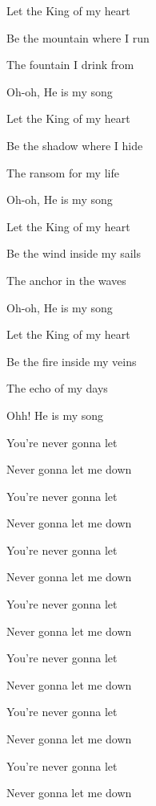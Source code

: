 \documentclass[9pt]{extarticle}
\begin{document}
\bsong

\bi

\ei

\bv
Let the King of my heart

Be the mountain where I run

The fountain I drink from

Oh-oh, He is my song

Let the King of my heart

Be the shadow where I hide

The ransom for my life

Oh-oh, He is my song
\ev

\bc

\ec

\bv
Let the King of my heart

Be the wind inside my sails

The anchor in the waves

Oh-oh, He is my song

Let the King of my heart

Be the fire inside my veins

The echo of my days

Ohh! He is my song
\ev


\bb
You're never gonna let

Never gonna let me down

You're never gonna let

Never gonna let me down

You're never gonna let

Never gonna let me down

You're never gonna let

Never gonna let me down

You're never gonna let

Never gonna let me down

You're never gonna let

Never gonna let me down

You're never gonna let

Never gonna let me down
\eb


\esong
\end{document}

